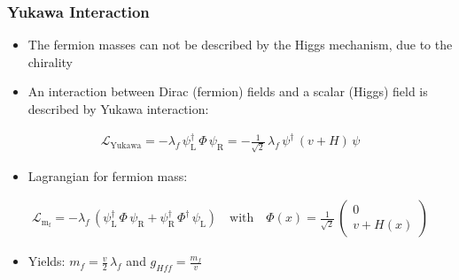 \documentclass[xcolor={usenames,dvipsnames,svgnames,table}]{beamer}
\begin{document}
\begin{frame}
    \frametitle{Yukawa Interaction}
    \begin{itemize}
        \item The fermion masses can not be described by the Higgs mechanism, due to the chirality
        \item An interaction between Dirac (fermion) fields and a scalar (Higgs) field is described by Yukawa interaction:
    \end{itemize}
    \begin{gather*}
        \label{eq_lagrangian_yukawa}
        \mathcal{L}_\mathrm{Yukawa} = - \lambda_f \, \ensuremath{\psi}\xspace_\mathrm{L}^\dagger \, \Phi \, \ensuremath{\psi}\xspace_\mathrm{R} = -\frac{1}{\sqrt 2} \, \lambda_f \, \ensuremath{\psi}\xspace^\dagger \, (v+H) \, \ensuremath{\psi}\xspace
    \end{gather*}
    \begin{itemize}
        \item Lagrangian for fermion mass:
    \end{itemize}
    \begin{gather*}
        \label{eq_lagrandian_mf}
        \mathcal{L}_\mathrm{m_f}= - \lambda_f \, (\ensuremath{\psi}\xspace_\mathrm{L}^\dagger \, \Phi \, \ensuremath{\psi}\xspace_\mathrm{R}+ \ensuremath{\psi}\xspace_\mathrm{R}^\dagger \, \Phi^\dagger \, \ensuremath{\psi}\xspace_\mathrm{L}) \quad \text{with} \quad \Phi(x) = \frac{1}{\sqrt 2} \, \begin{pmatrix} 0 \\ v + H(x) \end{pmatrix}
    \end{gather*}
    \begin{itemize}
        \item Yields: $m_f = \frac{v}{2} \, \lambda_f$ and $g_{Hff} = \frac{m_f}{v}$
    \end{itemize}
\end{frame}
\end{document}
